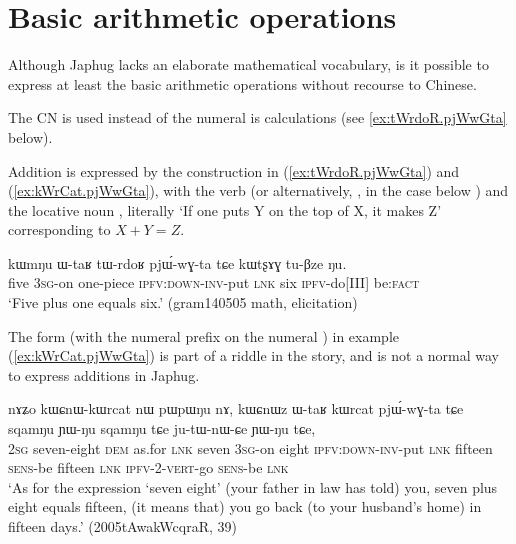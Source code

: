 \section{Basic arithmetic operations} \label{sec:arithmetic}

Although Japhug lacks an elaborate mathematical vocabulary, is it possible to express at least the basic arithmetic operations without recourse to Chinese. 

The CN  is used instead of the numeral  is calculations (see \ref{ex:tWrdoR.pjWwGta} below).

Addition is expressed by the construction in (\ref{ex:tWrdoR.pjWwGta}) and (\ref{ex:kWrCat.pjWwGta}), with the verb  (or alternatively, , in the case below ) and the locative noun , literally  `If one puts Y on the top of X, it makes Z' corresponding to $X+Y=Z$.  

\begin{exe}
\ex \label{ex:tWrdoR.pjWwGta}
 \gll kɯmŋu ɯ-taʁ tɯ-rdoʁ pjɯ́-wɣ-ta tɕe kɯtʂɤɣ tu-βze ŋu.  \\
 five \textsc{3sg}-on one-piece \textsc{ipfv}:\textsc{down}-\textsc{inv}-put \textsc{lnk} six \textsc{ipfv}-do[III] be:\textsc{fact} \\
 \glt `Five plus one equals six.' (gram140505 math, elicitation)
\end{exe}

The form  (with the numeral prefix  on the numeral ) in example (\ref{ex:kWrCat.pjWwGta}) is part of a riddle in the story, and is not a normal way to express additions in Japhug.

\begin{exe}
\ex \label{ex:kWrCat.pjWwGta}
 \gll  nɤʑo kɯɕnɯ-kɯrcat nɯ pɯpɯŋu nɤ, kɯɕnɯz ɯ-taʁ kɯrcat pjɯ́-wɣ-ta tɕe sqamŋu ɲɯ-ŋu sqamŋu tɕe ju-tɯ-nɯ-ɕe ɲɯ-ŋu tɕe, \\
 \textsc{2sg} seven-eight \textsc{dem} as.for \textsc{lnk} seven  \textsc{3sg}-on eight \textsc{ipfv}:\textsc{down}-\textsc{inv}-put \textsc{lnk}  fifteen   \textsc{sens}-be fifteen \textsc{lnk} \textsc{ipfv}-2-\textsc{vert}-go \textsc{sens}-be \textsc{lnk} \\
\glt `As for the expression `seven eight' (your father in law has told) you, seven plus eight equals fifteen, (it means that) you go back (to your husband's home) in fifteen days.' (2005tAwakWcqraR, 39)
\end{exe}

